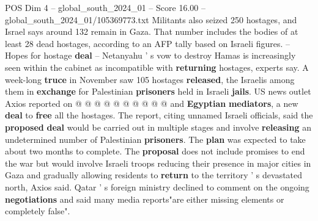 \begin{textsample}{POS Dim 4 – global\_south\_2024\_01 – Score 16.00 – global\_south\_2024\_01/105369773.txt}
Militants also seized 250 hostages, and Israel says around 132 remain in Gaza.
That number includes the bodies of at least 28 dead hostages, according to an AFP tally based on Israeli figures. -- Hopes for hostage \textbf{deal} -- Netanyahu ' s vow to destroy Hamas is increasingly seen within the cabinet as incompatible with \textbf{returning} hostages, experts say.
A week-long \textbf{truce} in November saw 105 hostages \textbf{released}, the Israelis among them in \textbf{exchange} for Palestinian \textbf{prisoners} held in Israeli \textbf{jails}.
US news outlet Axios reported on @ @ @ @ @ @ @ @ @ @ and \textbf{Egyptian} \textbf{mediators}, a new \textbf{deal} to \textbf{free} all the hostages.
The report, citing unnamed Israeli officials, said the \textbf{proposed} \textbf{deal} would be carried out in multiple stages and involve \textbf{releasing} an undetermined number of Palestinian \textbf{prisoners}.
The \textbf{plan} was expected to take about two months to complete.
The \textbf{proposal} does not include promises to end the war but would involve Israeli troops reducing their presence in major cities in Gaza and gradually allowing residents to \textbf{return} to the territory ' s devastated north, Axios said.
Qatar ' s foreign ministry declined to comment on the ongoing \textbf{negotiations} and said many media reports"are either missing elements or completely false".

\end{textsample}
